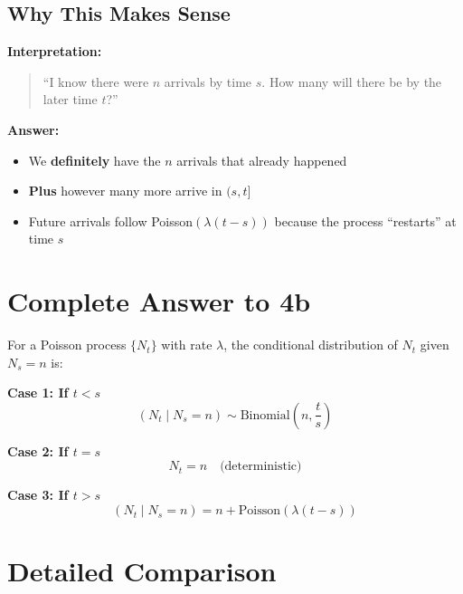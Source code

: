 \documentclass[11pt]{article}
\begin{document}
\subsection{Why This Makes Sense}

\textbf{Interpretation:}
\begin{quote}
``I know there were $n$ arrivals by time $s$. How many will there be by the later time $t$?''
\end{quote}

\textbf{Answer:}
\begin{itemize}
    \item We \textbf{definitely} have the $n$ arrivals that already happened
    \item \textbf{Plus} however many more arrive in $(s, t]$
    \item Future arrivals follow Poisson$(\lambda(t-s))$ because the process ``restarts'' at time $s$
\end{itemize}

\section{Complete Answer to 4b}

\begin{tcolorbox}[colback=yellow!10!white,colframe=orange!75!black,title=Complete Answer to Question 4b]
For a Poisson process $\{N_t\}$ with rate $\lambda$, the conditional distribution of $N_t$ given $N_s = n$ is:

\vspace{0.3cm}

\textbf{Case 1: If $t < s$}
\[
(N_t \mid N_s = n) \sim \text{Binomial}\left(n, \frac{t}{s}\right)
\]

\vspace{0.3cm}

\textbf{Case 2: If $t = s$}
\[
N_t = n \quad \text{(deterministic)}
\]

\vspace{0.3cm}

\textbf{Case 3: If $t > s$}
\[
(N_t \mid N_s = n) = n + \text{Poisson}(\lambda(t-s))
\]
\end{tcolorbox}

\section{Detailed Comparison}
\end{document}
